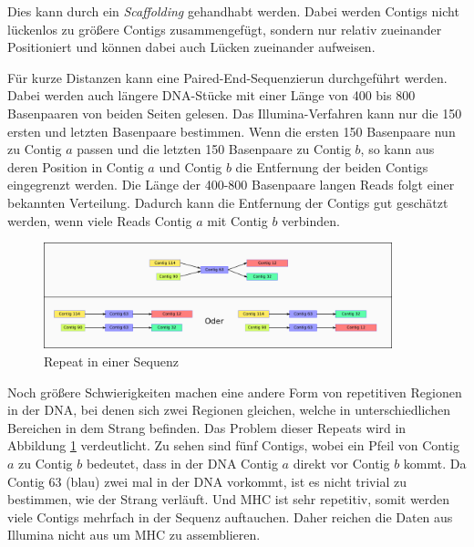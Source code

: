 Dies kann durch ein \emph{Scaffolding} gehandhabt werden. Dabei werden Contigs nicht lückenlos zu größere Contigs zusammengefügt, sondern nur relativ zueinander Positioniert und können dabei auch Lücken zueinander aufweisen.

Für kurze Distanzen kann eine Paired-End-Sequenzierun durchgeführt werden.
Dabei werden auch längere DNA-Stücke mit einer Länge von 400 bis 800 Basenpaaren von beiden Seiten gelesen. Das Illumina-Verfahren kann nur die 150 ersten und letzten Basenpaare bestimmen. Wenn die ersten 150 Basenpaare nun zu Contig $a$ passen und die letzten 150 Basenpaare zu Contig $b$, so kann aus deren Position in Contig $a$ und Contig $b$ die Entfernung der beiden Contigs eingegrenzt werden. Die Länge der 400-800 Basenpaare langen Reads folgt einer bekannten Verteilung. Dadurch kann die Entfernung der Contigs gut geschätzt werden, wenn viele Reads Contig $a$ mit Contig $b$ verbinden.





\begin{figure}[h!]
\begin{center}
\includegraphics[width=0.9\textwidth]{bilder/repeat}
\end{center}
\caption{Repeat in einer Sequenz}
\label{repeat}
\end{figure}



Noch größere Schwierigkeiten machen eine andere Form von repetitiven Regionen in der DNA, bei denen sich zwei Regionen gleichen, welche in unterschiedlichen Bereichen in dem Strang befinden. Das Problem dieser Repeats wird in Abbildung \ref{repeat} verdeutlicht. 
Zu sehen sind fünf Contigs, wobei ein Pfeil von Contig $a$ zu Contig $b$ bedeutet, dass in der DNA Contig $a$ direkt vor Contig $b$ kommt. Da Contig 63 (blau) zwei mal in der DNA vorkommt, ist es nicht trivial zu bestimmen, wie der Strang verläuft. Und MHC ist sehr repetitiv, somit werden viele Contigs mehrfach in der Sequenz auftauchen. Daher reichen die Daten aus Illumina nicht aus um MHC zu assemblieren.


